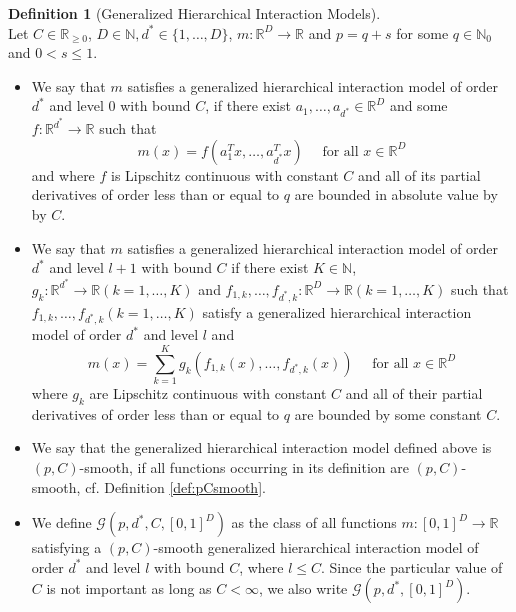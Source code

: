 \documentclass[12pt]{article}
\theoremstyle{myplain}
\theoremstyle{definition}
\theoremstyle{definition}
\newtheorem{definition}{Definition}
\theoremstyle{remark}
\numberwithin{equation}{section}
\begin{document}
\begin{definition}[Generalized Hierarchical Interaction Models]\label{def:GHI}\ \\
Let $C\in \mathbb{R}_{\geq0}$, $D \in \mathbb{N}, d^{*} \in\{1, \ldots, D\}$, $m: \mathbb{R}^{D} \rightarrow \mathbb{R}$ and $p=q+s$ for some $q \in \mathbb{N}_0$ and $0<s \leq 1$. 
\begin{itemize}
    \item[a)] We say that $m$ satisfies a generalized hierarchical interaction model of order $d^{*}$ and level $0$ with bound $C$, if there exist $a_{1}, \ldots, a_{d^{*}} \in \mathbb{R}^{D}$ and some $f: \mathbb{R}^{d^{*}} \rightarrow \mathbb{R}$ such that
$$
m(x)=f\left(a_{1}^{T} x, \ldots, a_{d^{*}}^{T} x\right) \quad \text { for all } x \in \mathbb{R}^{D}
$$
and where $f$ is Lipschitz continuous with constant $C$ and all of its partial derivatives of order less than or equal to $q$ are bounded in absolute value by by $C$.
    \item[b)] We say that $m$ satisfies a generalized hierarchical interaction model of order $d^{*}$ and level $l+1$ with bound $C$ if there exist $K \in \mathbb{N}$, $g_{k}: \mathbb{R}^{d^{*}} \rightarrow \mathbb{R}(k=1, \ldots, K)$ and
$f_{1, k}, \ldots, f_{d^{*}, k}: \mathbb{R}^{D} \rightarrow \mathbb{R}(k=1, \ldots, K)$ such that $f_{1, k}, \ldots, f_{d^{*}, k}(k=1, \ldots, K)$
satisfy a generalized hierarchical interaction model of order $d^{*}$ and level $l$ and
$$
m(x)=\sum_{k=1}^{K} g_{k}\left(f_{1, k}(x), \ldots, f_{d^{*}, k}(x)\right) \quad \text { for all } x \in \mathbb{R}^{D}
$$
where $g_{k}$ are Lipschitz continuous with constant $C$ and all of their partial derivatives of order less than or equal to $q$ are bounded by some constant $C$.
    \item[c)] We say that the generalized hierarchical interaction model defined above is $(p, C)$-smooth, if all functions occurring in its definition are $(p, C)$-smooth, cf. Definition \ref{def:pCsmooth}. 
    \item[d)] We define $\mathcal{G}(p, d^{*}, C, [0,1]^D)$ as the class of all functions $m: [0,1]^D \rightarrow \mathbb{R}$ satisfying a $(p, C)$-smooth generalized hierarchical interaction model of order $d^*$ and level $l$ with bound $C$, where $l\leq C$. Since the particular value of $C$ is not important as long as $C<\infty$, we also write $\mathcal{G}(p, d^*, [0,1]^D)$.
\end{itemize}
\end{definition}
\end{document}
